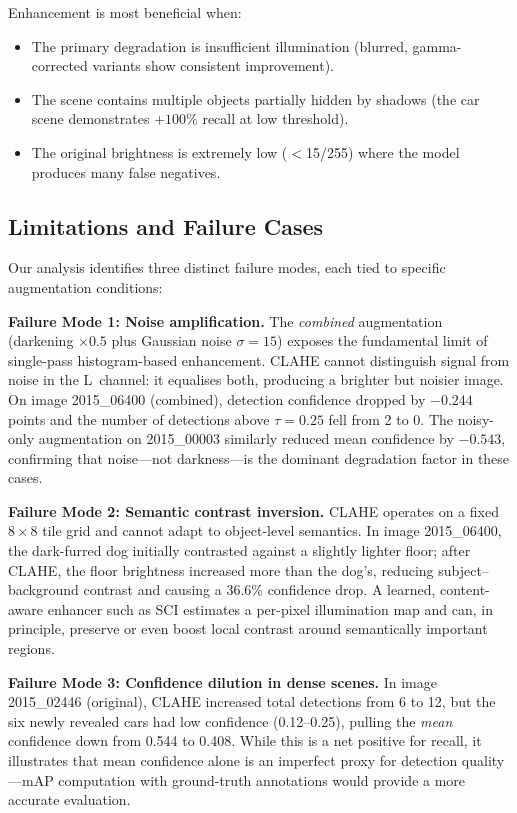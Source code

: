 \documentclass[conference]{IEEEtran}
\begin{document}
Enhancement is most beneficial when:
\begin{itemize}
  \item The primary degradation is insufficient illumination (blurred,
  gamma-corrected variants show consistent improvement).
  \item The scene contains multiple objects partially hidden by shadows
  (the car scene demonstrates $+100\%$ recall at low threshold).
  \item The original brightness is extremely low ($<$15/255) where the
  model produces many false negatives.
\end{itemize}

\subsection{Limitations and Failure Cases}

Our analysis identifies three distinct failure modes, each tied to
specific augmentation conditions:

\textbf{Failure Mode 1: Noise amplification.}
The \emph{combined} augmentation (darkening $\times 0.5$ plus Gaussian
noise $\sigma=15$) exposes the fundamental limit of single-pass
histogram-based enhancement.  CLAHE cannot distinguish signal from
noise in the L~channel: it equalises both, producing a brighter but
noisier image.  On image 2015\_06400 (combined), detection confidence
dropped by $-0.244$ points and the number of detections above
$\tau=0.25$ fell from 2 to 0.  The noisy-only augmentation on
2015\_00003 similarly reduced mean confidence by $-0.543$, confirming
that noise---not darkness---is the dominant degradation factor in
these cases.

\textbf{Failure Mode 2: Semantic contrast inversion.}
CLAHE operates on a fixed $8{\times}8$ tile grid and cannot adapt to
object-level semantics.  In image 2015\_06400, the dark-furred dog
initially contrasted against a slightly lighter floor; after CLAHE,
the floor brightness increased more than the dog's, reducing
subject--background contrast and causing a 36.6\% confidence drop.
A learned, content-aware enhancer such as SCI estimates a per-pixel
illumination map and can, in principle, preserve or even boost local
contrast around semantically important regions.

\textbf{Failure Mode 3: Confidence dilution in dense scenes.}
In image 2015\_02446 (original), CLAHE increased total detections
from 6 to 12, but the six newly revealed cars had low confidence
(0.12--0.25), pulling the \emph{mean} confidence down from 0.544 to
0.408.  While this is a net positive for recall, it illustrates
that mean confidence alone is an imperfect proxy for detection
quality---mAP computation with ground-truth annotations would
provide a more accurate evaluation.
\end{document}
